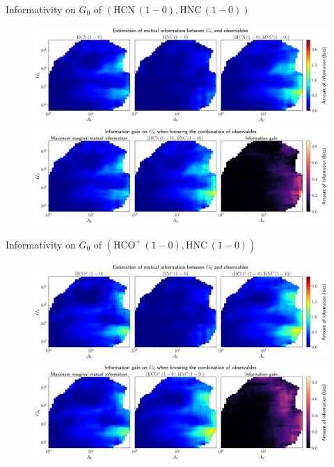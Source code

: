 \documentclass{beamer}
\begin{document}
\begin{frame}{Informativity on $G_0$ of $\left(\mathrm{HCN\,(1-0)},\mathrm{HNC\,(1-0)}\right)$}
    \begin{figure}
        \centering
        \includegraphics[width=0.95\linewidth]{../mi/g0__hcn10_hnc10_mi.png}
        \vfill
        \includegraphics[width=0.95\linewidth]{../mi/g0__hcn10_hnc10_mi_gain.png}
    \end{figure}
\end{frame}

\begin{frame}{Informativity on $G_0$ of $\left(\mathrm{HCO^+\,(1-0)},\mathrm{HNC\,(1-0)}\right)$}
    \begin{figure}
        \centering
        \includegraphics[width=0.95\linewidth]{../mi/g0__hcop10_hnc10_mi.png}
        \vfill
        \includegraphics[width=0.95\linewidth]{../mi/g0__hcop10_hnc10_mi_gain.png}
    \end{figure}
\end{frame}
\end{document}
